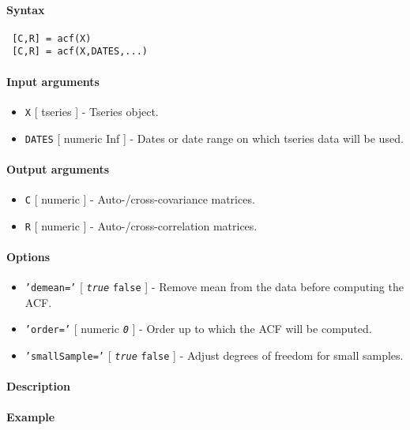 


	\paragraph{Syntax}
 
 \begin{verbatim}
 [C,R] = acf(X)
 [C,R] = acf(X,DATES,...)
 \end{verbatim}
 
 \paragraph{Input arguments}
 
 \begin{itemize}
 \item
   \texttt{X} {[} tseries {]} - Tseries object.
 \item
   \texttt{DATES} {[} numeric \textbar{} Inf {]} - Dates or date range on
   which tseries data will be used.
 \end{itemize}
 
 \paragraph{Output arguments}
 
 \begin{itemize}
 \item
   \texttt{C} {[} numeric {]} - Auto-/cross-covariance matrices.
 \item
   \texttt{R} {[} numeric {]} - Auto-/cross-correlation matrices.
 \end{itemize}
 
 \paragraph{Options}
 
 \begin{itemize}
 \item
   \texttt{'demean='} {[} \emph{\texttt{true}} \textbar{} \texttt{false}
   {]} - Remove mean from the data before computing the ACF.
 \item
   \texttt{'order='} {[} numeric \textbar{} \emph{\texttt{0}} {]} - Order
   up to which the ACF will be computed.
 \item
   \texttt{'smallSample='} {[} \emph{\texttt{true}} \textbar{}
   \texttt{false} {]} - Adjust degrees of freedom for small samples.
 \end{itemize}
 
 \paragraph{Description}
 
 \paragraph{Example}



